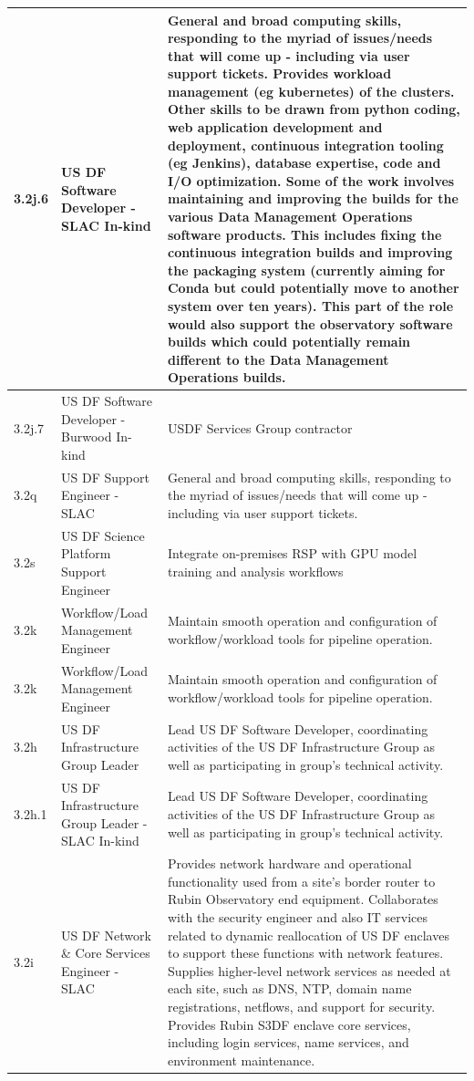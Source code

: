 \begin{longtable} {|p{}|p{}|p{}|}
{3.2j.6}&{US DF Software Developer - SLAC In-kind}&{General and broad computing skills, responding to the myriad of issues/needs that will come up - including via user support tickets. Provides workload management (eg kubernetes) of the clusters. Other skills to be drawn from python coding, web application development and deployment, continuous integration tooling (eg Jenkins), database expertise, code and I/O optimization. Some of the work involves maintaining and improving the builds for the various Data Management Operations software products. This includes fixing the continuous integration builds and improving the packaging system (currently aiming for Conda but could potentially move to another system over ten years). This part of the role would also support the observatory software builds which could potentially remain different to the Data Management Operations builds.} \\ \hline
{3.2j.7}&{US DF Software Developer - Burwood In-kind}&{USDF Services Group contractor} \\ \hline
{3.2q}&{US DF Support Engineer - SLAC}&{General and broad computing skills, responding to the myriad of issues/needs that will come up - including via user support tickets.} \\ \hline
{3.2s}&{US DF Science Platform Support Engineer}&{Integrate on-premises RSP with GPU model training and analysis workflows} \\ \hline
{3.2k}&{Workflow/Load Management Engineer}&{Maintain smooth operation and configuration of workflow/workload tools for pipeline operation.} \\ \hline
{3.2k}&{Workflow/Load Management Engineer}&{Maintain smooth operation and configuration of workflow/workload tools for pipeline operation.} \\ \hline
{3.2h}&{US DF Infrastructure Group Leader}&{Lead US DF Software Developer, coordinating activities of the US DF Infrastructure Group as well as participating in group's technical activity.} \\ \hline
{3.2h.1}&{US DF Infrastructure Group Leader - SLAC In-kind}&{Lead US DF Software Developer, coordinating activities of the US DF Infrastructure Group as well as participating in group's technical activity.} \\ \hline
{3.2i}&{US DF Network \& Core Services Engineer - SLAC}&{Provides network hardware and operational functionality used from a site's border router to Rubin Observatory end equipment. Collaborates with the security engineer and also IT services related to dynamic reallocation of US DF enclaves to support these functions with network features. Supplies higher-level network services as needed at each site, such as DNS, NTP, domain name registrations, netflows, and support for security. Provides Rubin S3DF enclave core services, including login services, name services, and environment maintenance.} \\ \hline

\end{longtable}
